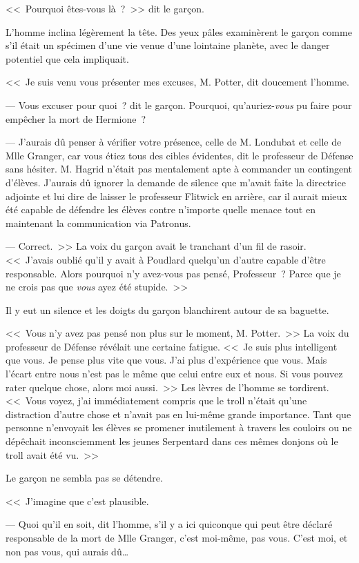 <<~Pourquoi êtes-vous là~?~>> dit le garçon.

L'homme inclina légèrement la tête. Des yeux pâles examinèrent le garçon comme s'il était un spécimen d'une vie venue d'une lointaine planète, avec le danger potentiel que cela impliquait.

<<~Je suis venu vous présenter mes excuses, M. Potter, dit doucement l'homme.

--- Vous excuser pour quoi~? dit le garçon. Pourquoi, qu'auriez-\emph{vous} pu faire pour empêcher la mort de Hermione~?

--- J'aurais dû penser à vérifier votre présence, celle de M. Londubat et celle de Mlle Granger, car vous étiez tous des cibles évidentes, dit le professeur de Défense sans hésiter. M. Hagrid n'était pas mentalement apte à commander un contingent d'élèves. J'aurais dû ignorer la demande de silence que m'avait faite la directrice adjointe et lui dire de laisser le professeur Flitwick en arrière, car il aurait mieux été capable de défendre les élèves contre n'importe quelle menace tout en maintenant la communication via Patronus.

--- Correct.~>> La voix du garçon avait le tranchant d'un fil de rasoir. <<~J'avais oublié qu'il y avait à Poudlard quelqu'un d'autre capable d'être responsable. Alors pourquoi n'y avez-vous pas pensé, Professeur~? Parce que je ne crois pas que \emph{vous} ayez été stupide.~>>

Il y eut un silence et les doigts du garçon blanchirent autour de sa baguette.

<<~Vous n'y avez pas pensé non plus sur le moment, M. Potter.~>> La voix du professeur de Défense révélait une certaine fatigue. <<~Je suis plus intelligent que vous. Je pense plus vite que vous. J'ai plus d'expérience que vous. Mais l'écart entre nous n'est pas le même que celui entre eux et nous. Si vous pouvez rater quelque chose, alors moi aussi.~>> Les lèvres de l'homme se tordirent. <<~Vous voyez, j'ai immédiatement compris que le troll n'était qu'une distraction d'autre chose et n'avait pas en lui-même grande importance. Tant que personne n'envoyait les élèves se promener inutilement à travers les couloirs ou ne dépêchait inconsciemment les jeunes Serpentard dans ces mêmes donjons où le troll avait été vu.~>>

Le garçon ne sembla pas se détendre.

<<~J'imagine que c'est plausible.

--- Quoi qu'il en soit, dit l'homme, s'il y a ici quiconque qui peut être déclaré responsable de la mort de Mlle Granger, c'est moi-même, pas vous. C'est moi, et non pas vous, qui aurais dû…

